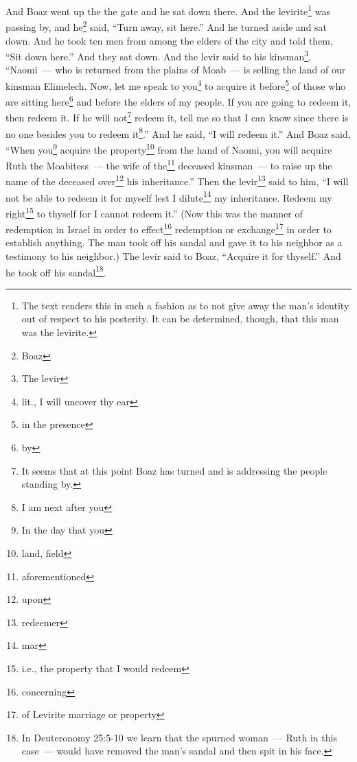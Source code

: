 
\begin{inparaenum}
     And Boaz went up the the gate and he sat down there. And the levirite\footnote{The text renders this in such a fashion as to not give away the man's identity out of respect to his posterity. It can be determined, though, that this man was the levirite.} was passing by, and he\footnote{Boaz} said, ``Turn away, sit here.'' And he turned aside and sat down.%
     And he took ten men from among the elders of the city and told them, ``Sit down here.'' And they sat down.%
     And the levir said to his kinsman\footnote{The levir}, ``Naomi~--- who is returned from the plains of Moab~--- is selling the land of our kinsman Elimelech.%
     Now, let me speak to you\footnote{lit., I will uncover thy ear} to acquire it before\footnote{in the presence} of those who are sitting here\footnote{by} and before the elders of my people. If you are going to redeem it, then redeem it. If he will not\footnote{It seems that at this point Boaz has turned and is addressing the people standing by.} redeem it, tell me so that I can know since there is no one besides you to redeem it\footnote{I am next after you}.'' And he said, ``I will redeem it.''%
     And Boaz said, ``When you\footnote{In the day that you} acquire the property\footnote{land, field} from the hand of Naomi, you will acquire Ruth the Moabitess~--- the wife of the\footnote{aforementioned} deceased kinsman~--- to raise up the name of the deceased over\footnote{upon} his inheritance.''%
     Then the levir\footnote{redeemer} said to him, ``I will not be able to redeem it for myself lest I dilute\footnote{mar} my inheritance. Redeem my right\footnote{i.e., the property that I would redeem} to thyself for I cannot redeem it.''%
     (Now this was the manner of redemption in Israel in order to effect\footnote{concerning} redemption or exchange\footnote{of Levirite marriage or property} in order to establish anything. The man took off his sandal and gave it to his neighbor as a testimony to his neighbor.)%
     The levir said to Boaz, ``Acquire it for thyself.'' And he took off his sandal\footnote{In Deuteronomy 25:5-10 we learn that the spurned woman~--- Ruth in this case~--- would have removed the man's sandal and then spit in his face.}.%

\end{inparaenum}
